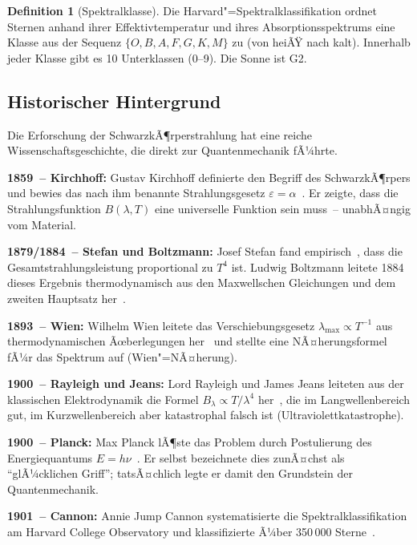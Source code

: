 ﻿\documentclass[a4paper,12pt]{article}
\theoremstyle{definition}
\newtheorem{definition}{Definition}
\begin{document}
\begin{definition}[Spektralklasse]
    Die Harvard"=Spektralklassifikation ordnet Sternen anhand ihrer Effektivtemperatur
    und ihres Absorptionsspektrums eine Klasse aus der Sequenz
    $\{O, B, A, F, G, K, M\}$ zu (von heiÃŸ nach kalt). Innerhalb jeder Klasse
    gibt es 10 Unterklassen (0--9). Die Sonne ist G2.
\end{definition}

\subsection{Historischer Hintergrund}

Die Erforschung der SchwarzkÃ¶rperstrahlung hat eine reiche Wissenschaftsgeschichte,
die direkt zur Quantenmechanik fÃ¼hrte.

\textbf{1859~-- Kirchhoff:} Gustav Kirchhoff definierte den Begriff des SchwarzkÃ¶rpers
und bewies das nach ihm benannte Strahlungsgesetz $\varepsilon = \alpha$~\cite{kirchhoff1860}.
Er zeigte, dass die Strahlungsfunktion $B(\lambda,T)$ eine universelle Funktion
sein muss~-- unabhÃ¤ngig vom Material.

\textbf{1879/1884~-- Stefan und Boltzmann:} Josef Stefan fand empirisch~\cite{stefan1879},
dass die Gesamtstrahlungsleistung proportional zu $T^4$ ist. Ludwig Boltzmann
leitete 1884 dieses Ergebnis thermodynamisch aus den Maxwellschen Gleichungen
und dem zweiten Hauptsatz her~\cite{boltzmann1884}.

\textbf{1893~-- Wien:} Wilhelm Wien leitete das Verschiebungsgesetz
$\lambda_{\max} \propto T^{-1}$ aus thermodynamischen Ãœberlegungen her~\cite{wien1893}
und stellte eine NÃ¤herungsformel fÃ¼r das Spektrum auf (Wien"=NÃ¤herung).

\textbf{1900~-- Rayleigh und Jeans:} Lord Rayleigh und James Jeans leiteten aus der
klassischen Elektrodynamik die Formel $B_\lambda \propto T/\lambda^4$ her~\cite{rayleigh1900},
die im Langwellenbereich gut, im Kurzwellenbereich aber katastrophal falsch ist
(Ultraviolettkatastrophe).

\textbf{1900~-- Planck:} Max Planck lÃ¶ste das Problem durch Postulierung
des Energiequantums $E = h\nu$~\cite{planck1900}. Er selbst bezeichnete dies
zunÃ¤chst als ``glÃ¼cklichen Griff''; tatsÃ¤chlich legte er damit den Grundstein
der Quantenmechanik.

\textbf{1901~-- Cannon:} Annie Jump Cannon systematisierte die Spektralklassifikation
am Harvard College Observatory und klassifizierte Ã¼ber 350\,000 Sterne~\cite{cannon1901}.
\end{document}
